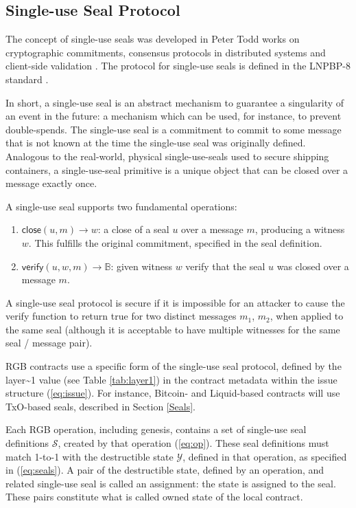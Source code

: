 \documentclass[9pt,oneside]{amsart}
\begin{document}
\begin{multicols}{2}


\subsection{Single-use Seal Protocol}\label{SUS}

The concept of single-use seals was developed in Peter Todd works on cryptographic commitments,
consensus protocols in distributed systems and client-side validation \cite{SUS1, SUS2, SUS3, SUS4}.
The protocol for single-use seals is defined in the LNPBP-8 standard \cite{LNPBP8}.

In short, a single-use seal is an abstract mechanism to guarantee
a singularity of an event in the future:
a mechanism which can be used, for instance, to prevent double-spends.
The single-use seal is a commitment to commit to some message that is not known
at the time the single-use seal was originally defined.
Analogous to the real-world, physical single-use-seals used to secure shipping containers,
a single-use-seal primitive is a unique object that can be closed over a message exactly once.

A single-use seal supports two fundamental operations:
\begin{enumerate}
    \item $\mathsf{close}(u,m) \rightarrow w$: a close of a seal $u$ over a message $m$, producing a witness $w$.
    This fulfills the original commitment, specified in the seal definition.
    \item $\mathsf{verify}(u,w,m) \rightarrow \mathbb{B}$: 
    given witness $w$ verify that the seal $u$ was closed over a message $m$.
\end{enumerate}

A single-use seal protocol is secure if it is impossible for an attacker
to cause the \textsf{verify} function to return \textsf{true}
for two distinct messages $m_1$, $m_2$, when applied to the same seal
(although it is acceptable to have multiple witnesses for the same seal / message pair).

RGB contracts use a specific form of the single-use seal protocol,
defined by the \gls{layer~1} value (see Table \ref{tab:layer1})
in the contract metadata within the issue structure (\ref{eq:issue}).
For instance, Bitcoin- and Liquid-based contracts will use TxO-based seals,
described in Section \ref{Seals}.

Each RGB operation, including genesis, contains a set of single-use seal definitions $\mathcal{S}$,
created by that operation (\ref{eq:op}).
These seal definitions must match 1-to-1 with the destructible state $\mathcal{Y}$,
defined in that operation, as specified in (\ref{eq:seals}).
A pair of the destructible state, defined by an operation, and related single-use seal
is called an \gls{assignment}: the state is assigned to the seal.
These pairs constitute what is called \gls{owned state} of the local contract.


\end{multicols}
\end{document}
